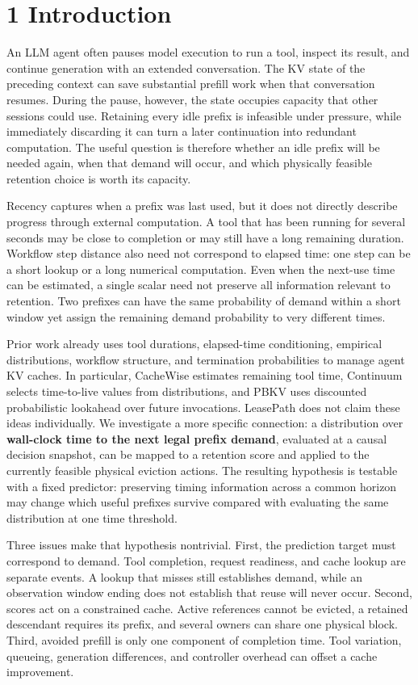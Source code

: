 \documentclass[
  english,
  10pt,
]{article}
\begin{document}
\section{1 Introduction}\label{introduction}

An LLM agent often pauses model execution to run a tool, inspect its
result, and continue generation with an extended conversation. The KV
state of the preceding context can save substantial prefill work when
that conversation resumes. During the pause, however, the state occupies
capacity that other sessions could use. Retaining every idle prefix is
infeasible under pressure, while immediately discarding it can turn a
later continuation into redundant computation. The useful question is
therefore whether an idle prefix will be needed again, when that demand
will occur, and which physically feasible retention choice is worth its
capacity.

Recency captures when a prefix was last used, but it does not directly
describe progress through external computation. A tool that has been
running for several seconds may be close to completion or may still have
a long remaining duration. Workflow step distance also need not
correspond to elapsed time: one step can be a short lookup or a long
numerical computation. Even when the next-use time can be estimated, a
single scalar need not preserve all information relevant to retention.
Two prefixes can have the same probability of demand within a short
window yet assign the remaining demand probability to very different
times.

Prior work already uses tool durations, elapsed-time conditioning,
empirical distributions, workflow structure, and termination
probabilities to manage agent KV caches. In particular, CacheWise
estimates remaining tool time, Continuum selects time-to-live values
from distributions, and PBKV uses discounted probabilistic lookahead
over future invocations. LeasePath does not claim these ideas
individually. We investigate a more specific connection: a distribution
over \textbf{wall-clock time to the next legal prefix demand}, evaluated
at a causal decision snapshot, can be mapped to a retention score and
applied to the currently feasible physical eviction actions. The
resulting hypothesis is testable with a fixed predictor: preserving
timing information across a common horizon may change which useful
prefixes survive compared with evaluating the same distribution at one
time threshold.

Three issues make that hypothesis nontrivial. First, the prediction
target must correspond to demand. Tool completion, request readiness,
and cache lookup are separate events. A lookup that misses still
establishes demand, while an observation window ending does not
establish that reuse will never occur. Second, scores act on a
constrained cache. Active references cannot be evicted, a retained
descendant requires its prefix, and several owners can share one
physical block. Third, avoided prefill is only one component of
completion time. Tool variation, queueing, generation differences, and
controller overhead can offset a cache improvement.
\end{document}
